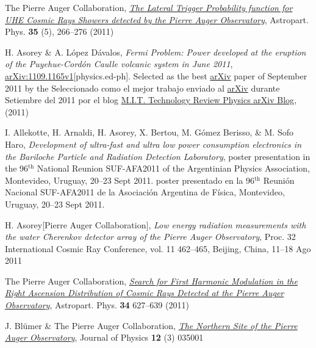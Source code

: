 \begin{etaremune}
\item {} The Pierre Auger Collaboration, 
\href{http://dx.doi.org/10.1016/j.astropartphys.2011.08.001}{\emph{The Lateral
Trigger Probability function for UHE Cosmic Rays Showers detected by the Pierre
Auger Observatory}}, Astropart. Phys. {\bf{35}} (5), 266--276 (2011)

\item {}H. Asorey \& A. López Dávalos, {\emph{Fermi Problem: Power
developed at the eruption of the Puyehue-Cordón Caulle volcanic system in June
2011}}, \href{http://arxiv.org/abs/1109.1165}{arXiv:1109.1165v1}[physics.ed-ph]. \ifeng
Selected as the best \href{http://arxiv.org}{arXiv} paper of September 2011 by the
\else
Seleccionado como el mejor trabajo enviado al \href{http://arxiv.org}{arXiv} durante Setiembre del 2011 por el blog 
\fi
\href{http://www.technologyreview.com/blog/arxiv/27140/}{M.I.T. Technology
Review Physics arXiv Blog}, (2011)

\item {}I. Allekotte, H. Arnaldi, H. Asorey, X. Bertou, M. Gómez Berisso, \& M. Sofo Haro, {\emph{Development of ultra-fast and ultra low power consumption electronics in the Bariloche Particle and Radiation Detection Laboratory}},
\ifeng
poster presentation in the 96$^{\mathrm{th}}$ National Reunion SUF-AFA2011 of the Argentinian Physics Association, Montevideo, Uruguay, 20--23 Sept 2011.
\else
poster presentado en la 96$^{\mathrm{th}}$ Reunión Nacional SUF-AFA2011 de la Asociación Argentina de Física, Montevideo, Uruguay, 20--23 Sept 2011.
\fi

\item {}H. Asorey[Pierre Auger Collaboration], {\emph{Low energy radiation
measurements with the water Cherenkov detector array of the Pierre Auger
Observatory}}, \en Proc. 32 International Cosmic Ray Conference, vol. 11
462--465, Beijing, China, 11--18 Ago 2011

\item {}The Pierre Auger Collaboration,
\href{http://dx.doi.org/10.1016/j.astropartphys.2010.12.007}{\emph{Search for
First Harmonic Modulation in the Right Ascension Distribution of Cosmic Rays
Detected at the Pierre Auger Observatory}}, Astropart. Phys. {\bf 34} 627--639
(2011)

\item {}J. Bl\"umer \& The Pierre Auger Collaboration,
\href{http://dx.doi.org/10.1088/1367-2630/12/3/035001}{\emph{The Northern Site
of the Pierre Auger Observatory}}, Journal of Physics {\bf 12} (3) 035001


\end{etaremune}
